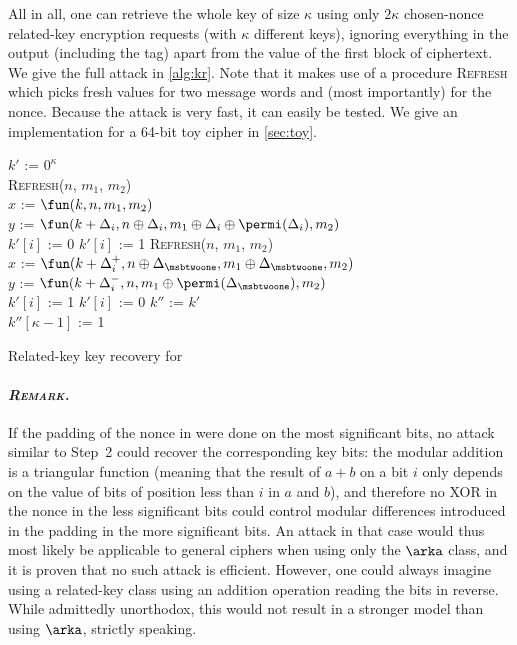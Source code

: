 All in all, one can retrieve the whole key of size
$\kappa$ using only $2\kappa$ chosen-nonce related-key encryption requests (with $\kappa$ different keys), ignoring
everything in the output (including the tag) apart from the value of the first block
of ciphertext. We give the full attack in \autoref{alg:kr}. Note that it makes use
of a procedure \textsc{Refresh} which picks fresh values for two message words and (most importantly)
for the nonce. Because
the attack is very fast, it can easily be tested. We give an implementation
for a 64-bit toy cipher in \autoref{sec:toy}.

\begin{algorithm}[h]
\LinesNumbered
{}

$k'$ := $0^\kappa$\\
{
	\textsc{Refresh}($n$, $m_1$, $m_2$)\\
	$x$ := $\fun(k, n, m_1, m_2)$\\
	$y$ := $\fun(k + \Delta_i, n \oplus \Delta_i,
                 m_1 \oplus \Delta_i \oplus \permi(\Delta_i), m_2)$\\
	{
		$k'[i]$ := 0	
	}
	\Else
	{
		$k'[i]$ := 1
	}
}
{
	\textsc{Refresh}($n$, $m_1$, $m_2$)\\
	$x$ := $\fun(k + \Delta_i^+, n \oplus \Delta_{\msbtwoone}, m_1 \oplus \Delta_{\msbtwoone}, m_2)$\\
	$y$ := $\fun(k + \Delta_i^-, n, m_1 \oplus \permi(\Delta_{\msbtwoone}), m_2)$\\
	{
		$k'[i]$ := 1	
	}
	\Else
	{
		$k'[i]$ := 0
	}
}
$k''$ := $k'$\\
$k''[\kappa - 1]$ := 1\\
\caption{Related-key key recovery for \proestotr\label{alg:kr}}
\end{algorithm}


\paragraph{\emph{\textsc{Remark.}}} If the padding of the nonce in \proestotr were done on the most significant bits, no attack similar
to Step~2 could recover
the corresponding key bits: the modular addition is a triangular function (meaning that the result of $a + b$ on a bit $i$ only
depends on the value of bits of position less than $i$ in $a$ and $b$), and therefore no XOR in the nonce in the less
significant bits could control modular differences introduced in the padding in the more significant bits. An attack in that case would thus most likely
be applicable to general ciphers when using only the $\arka$ class, and it is proven that no such attack is efficient.
However, one could always imagine using a related-key class using an addition operation reading the bits in reverse. While
admittedly unorthodox, this would not result in a stronger model than using $\arka$, strictly speaking.

